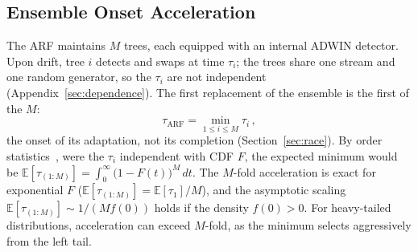 \documentclass[smallextended]{svjour3}
\begin{document}
\subsection{Ensemble Onset Acceleration}\label{sec:hydra}

The ARF maintains $M$ trees, each equipped with an internal ADWIN detector.
Upon drift, tree $i$ detects and swaps at time $\tau_i$; the trees share one stream and one random generator, so the $\tau_i$ are not independent (Appendix~\ref{sec:dependence}). The first replacement of the ensemble is the first of the $M$:
\begin{equation}\label{eq:hydra}
  \tau_{\mathrm{ARF}} = \min_{1 \le i \le M} \tau_i\,,
\end{equation}
the onset of its adaptation, not its completion (Section~\ref{sec:race}).
By order statistics~\cite{david_order_2003}, were the $\tau_i$ independent with CDF $F$, the expected minimum would be $\mathbb{E}[\tau_{(1:M)}] = \int_0^{\infty} \bigl(1 - F(t)\bigr)^M \, dt$.
The $M$-fold acceleration is exact for exponential $F$ ($\mathbb{E}[\tau_{(1:M)}] = \mathbb{E}[\tau_1]/M$), and the asymptotic scaling $\mathbb{E}[\tau_{(1:M)}] \sim 1/(M f(0))$ holds if the density $f(0)>0$. For heavy-tailed distributions, acceleration can exceed $M$-fold, as the minimum selects aggressively from the left tail.
\end{document}
